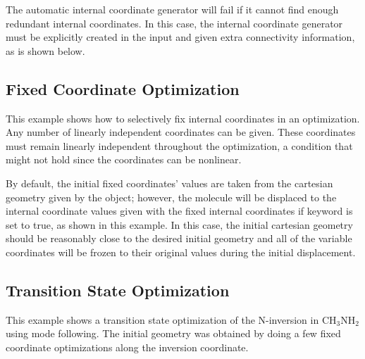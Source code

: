 The automatic internal coordinate generator will fail if it cannot find
enough redundant internal coordinates.  In this case, the internal
coordinate generator must be explicitly created in the input and given
extra connectivity information, as is shown below.



\subsection{Fixed Coordinate Optimization}
\label{fixedexample}

 This example shows how to selectively fix internal coordinates in an
optimization.  Any number of linearly independent coordinates can be given.
These coordinates must remain linearly independent throughout the
optimization, a condition that might not hold since the coordinates can be
nonlinear.

 By default, the initial fixed coordinates' values are taken from the
cartesian geometry given by the  object; however, the
molecule will be displaced to the internal coordinate values given with the
fixed internal coordinates if  keyword is set to
true, as shown in this example.  In this case, the initial cartesian
geometry should be reasonably close to the desired initial geometry and all
of the variable coordinates will be frozen to their original values during
the initial displacement.



\subsection{Transition State Optimization}
\label{tsexample}

This example shows a transition state optimization of the N-inversion in
$\mathrm{CH}_3\mathrm{NH}_2$ using mode following.  The initial geometry
was obtained by doing a few fixed coordinate optimizations along the
inversion coordinate.


